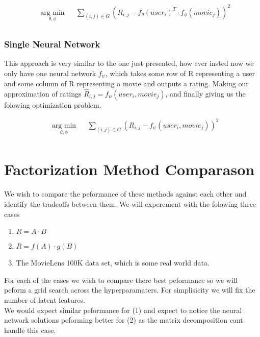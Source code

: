 \documentclass{article}
\begin{document}
\begin{equation*}
\begin{aligned}
& \underset{\theta, \phi}{\text{arg min}}
& & \sum_{(i,j) \in G} (R_{i,j} - f_{\theta}(user_i)^T \cdot f_{\phi}(movie_j))^2  \\
\end{aligned}
\end{equation*}

\subsubsection{Single Neural Network}
This approach is very similar to the one just presented, how ever insted now we only have one neural network $f_{\psi}$, which takes some row of R representing a user and some column of R representing a movie and outputs a rating. Making our approximation of ratings $\hat{R}_{i,j} = f_{\psi}(user_i, movie_j)$, and finally giving us the folowing optimization problem.

\begin{equation*}
\begin{aligned}
& \underset{\theta, \phi}{\text{arg min}}
& & \sum_{(i,j) \in G} (R_{i,j} - f_{\psi}(user_i, movie_j))^2  \\
\end{aligned}
\end{equation*}


\section{Factorization Method Comparason}
We wish to compare the peformance of these methods against each other and identify the tradeoffs between them. We will experement with the folowing three cases

\begin{enumerate}
\item $R = A \cdot B$
\item $R = f(A) \cdot g(B)$
\item The MovieLens 100K data set, which is some real world data.
\end{enumerate}

For each of the cases we wish to compare there best peformance so we will peform a grid search across the hyperparamaters. For simplisicity we will fix the number of latent features. \\

We would expect similar peformance for (1) and expect to notice the neural network solutions peforming better for (2) as the matrix decomposition cant handle this case.
\end{document}

